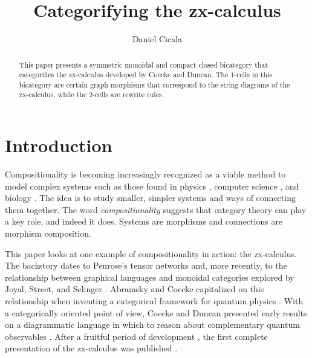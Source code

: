 \documentclass[11pt]{amsart}
\theoremstyle{definition}
\begin{document}
	

\begin{abstract}
	This paper presents a symmetric monoidal and compact closed bicategory that categorifies the zx-calculus developed by Coecke and Duncan.  The $1$-cells in this bicategory are certain graph morphisms that correspond to the string diagrams of the zx-calculus, while the $2$-cells are rewrite rules. 
\end{abstract}

\title{Categorifying the zx-calculus}
\author{Daniel Cicala}
\maketitle

\section{Introduction}
\label{sec:Introduction}

Compositionality is becoming increasingly recognized as a viable method to model complex systems such as those found in physics \cite{AbramCoecke_CatSemanticQuantum}, computer science \cite{SassoneSobocinski_PetriNets}, and biology \cite{BaezFongPollard_CompMarkovProcesses}.  The idea is to study smaller, simpler systems and ways of connecting them together.  The word \emph{compositionality} suggests that category theory can play a key role, and indeed it does.  Systems are morphisms and connections are morphism composition.   

This paper looks at one example of compositionality in action: the zx-calculus.  The backstory dates to Penrose's tensor networks \cite{Penrose_NegDimTensors} and, more recently, to the relationship between graphical languages and monoidal categories explored by Joyal, Street, and Selinger \cite{JoyalStreet_GeomTensorCalc,Selinger_GraphicsMonCats}.  Abramsky and Coecke capitalized on this relationship when inventing a categorical framework for quantum physics \cite{AbramCoecke_CatSemanticQuantum}.  With a categorically oriented point of view, Coecke and Duncan  presented early results on a diagrammatic language in which to reason about complementary quantum observables \cite{CoeckeDuncan_QuantumObsInitialReport}. After a fruitful period of development \cite{CoeckeEdwards_ToyTheories,CoeckeEdwardsSpekkens_PhaseGrpsNonLocality,CoeckePerdix_EnvironClassicChannels,DuncanPerdix_GraphStatesEulerDecomp,DuncanPerdrix_RewritingQuantumCompu,EvansDuncanLangPanan_ClassMutualUnbias,Pavlovic_QuanClassNondetermCompu}, the first complete presentation of the zx-calculus was published \cite{CoeckeDuncan_QuantumObsFullPaper}.  
\end{document}
